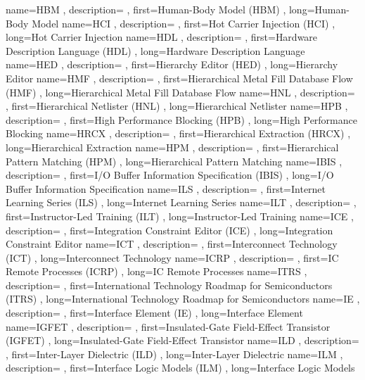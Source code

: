{ name={HBM}
, description={}
, first={Human-Body Model (HBM)}
, long={Human-Body Model}
}
{ name={HCI}
, description={}
, first={Hot Carrier Injection (HCI)}
, long={Hot Carrier Injection}
}
{ name={HDL}
, description={}
, first={Hardware Description Language (HDL)}
, long={Hardware Description Language}
}
{ name={HED}
, description={}
, first={Hierarchy Editor (HED)}
, long={Hierarchy Editor}
}
{ name={HMF}
, description={}
, first={Hierarchical Metal Fill Database Flow (HMF)}
, long={Hierarchical Metal Fill Database Flow}
}
{ name={HNL}
, description={}
, first={Hierarchical Netlister (HNL)}
, long={Hierarchical Netlister}
}
{ name={HPB}
, description={}
, first={High Performance Blocking (HPB)}
, long={High Performance Blocking}
}
{ name={HRCX}
, description={}
, first={Hierarchical Extraction (HRCX)}
, long={Hierarchical Extraction}
}
{ name={HPM}
, description={}
, first={Hierarchical Pattern Matching (HPM)}
, long={Hierarchical Pattern Matching}
}
{ name={IBIS}
, description={}
, first={I/O Buffer Information Specification (IBIS)}
, long={I/O Buffer Information Specification}
}
{ name={ILS}
, description={}
, first={Internet Learning Series (ILS)}
, long={Internet Learning Series}
}
{ name={ILT}
, description={}
, first={Instructor-Led Training (ILT)}
, long={Instructor-Led Training}
}
{ name={ICE}
, description={}
, first={Integration Constraint Editor (ICE)}
, long={Integration Constraint Editor}
}
{ name={ICT}
, description={}
, first={Interconnect Technology (ICT)}
, long={Interconnect Technology}
}
{ name={ICRP}
, description={}
, first={IC Remote Processes (ICRP)}
, long={IC Remote Processes}
}
{ name={ITRS}
, description={}
, first={International Technology Roadmap for Semiconductors (ITRS)}
, long={International Technology Roadmap for Semiconductors}
}
{ name={IE}
, description={}
, first={Interface Element (IE)}
, long={Interface Element}
}
{ name={IGFET}
, description={}
, first={Insulated-Gate Field-Effect Transistor (IGFET)}
, long={Insulated-Gate Field-Effect Transistor}
}
{ name={ILD}
, description={}
, first={Inter-Layer Dielectric (ILD)}
, long={Inter-Layer Dielectric}
}
{ name={ILM}
, description={}
, first={Interface Logic Models (ILM)}
, long={Interface Logic Models}
}
